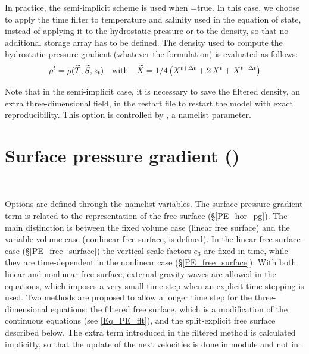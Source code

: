 In practice, the semi-implicit scheme is used when =true. 
In this case, we choose to apply the time filter to temperature and salinity used in 
the equation of state, instead of applying it to the hydrostatic pressure or to the 
density, so that no additional storage array has to be defined. The density used to 
compute the hydrostatic pressure gradient (whatever the formulation) is evaluated 
as follows:
\begin{equation} \label{Eq_rho_flt}
	\rho^t = \rho( \widetilde{T},\widetilde {S},z_t)
 \quad	  \text{with}	\quad 
	\widetilde{X} = 1 / 4 \left(  X^{t+\Delta t} +2 \,X^t + X^{t-\Delta t}  \right)
\end{equation}

Note that in the semi-implicit case, it is necessary to save the filtered density, an 
extra three-dimensional field, in the restart file to restart the model with exact 
reproducibility. This option is controlled by  , a namelist parameter.

\section  [Surface pressure gradient (\textit{dynspg}) ]
		{Surface pressure gradient ()}
\label{DYN_spg}

$\ $\newline      %

Options are defined through the  namelist variables.
The surface pressure gradient term is related to the representation of the free surface (\S\ref{PE_hor_pg}). The main distinction is between the fixed volume case (linear free surface) and the variable volume case (nonlinear free surface,  is defined). In the linear free surface case (\S\ref{PE_free_surface}) the vertical scale factors $e_{3}$ are fixed in time, while they are time-dependent in the nonlinear case (\S\ref{PE_free_surface}). With both linear and nonlinear free surface, external gravity waves are allowed in the equations, which imposes a very small time step when an explicit time stepping is used. Two methods are proposed to allow a longer time step for the three-dimensional equations: the filtered free surface, which is a modification of the continuous equations (see \eqref{Eq_PE_flt}), and the split-explicit free surface described below. The extra term introduced in the filtered method is calculated implicitly, so that the update of the next velocities is done in module  and not in .

